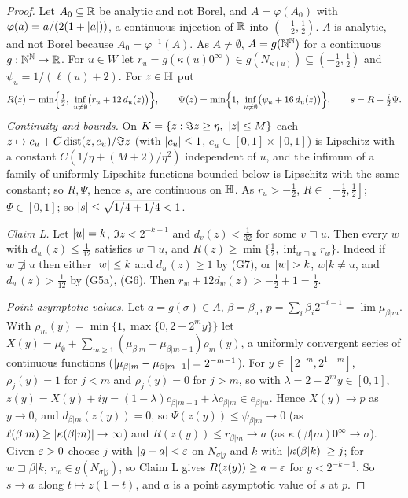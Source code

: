 \begin{proof}
Let $A_0\subseteq\mathbb{R}$ be analytic and not Borel, and $A=\varphi(A_0)$ with $\varphi(a)=a/(2(1+\lvert a\rvert))$, a continuous injection of $\mathbb{R}$
into $(-\frac12,\frac12)$. $A$ is analytic, and not Borel because $A_0=\varphi^{-1}(A)$. As $A\neq\emptyset$, $A=g(\mathbb{N}^{\mathbb{N}})$ for a continuous
$g:\mathbb{N}^{\mathbb{N}}\to\mathbb{R}$. For $u\in W$ let $r_u=g(\kappa(u)0^\infty)\in g(N_{\kappa(u)})\subseteq(-\frac12,\frac12)$ and $\psi_u=1/(\ell(u)+2)$. For $z\in\mathbb{H}$ put
\[R(z)=\min\Bigl\{\tfrac12,\ \inf_{u\ne\emptyset}\bigl(r_u+12\,d_u(z)\bigr)\Bigr\},\qquad
\Psi(z)=\min\Bigl\{1,\ \inf_{u\ne\emptyset}\bigl(\psi_u+16\,d_u(z)\bigr)\Bigr\},\qquad s=R+\tfrac i2\Psi.\]
\emph{Continuity and bounds.} On $K=\{z:\Im z\ge\eta,\ \lvert z\rvert\le M\}$ each $z\mapsto c_u+C\operatorname{dist}(z,e_u)/\Im z$ (with $\lvert c_u\rvert\le1$,
$e_u\subseteq[0,1]\times[0,1]$) is Lipschitz with a constant $C(1/\eta+(M+2)/\eta^2)$ independent of $u$, and the infimum of a family of
uniformly Lipschitz functions bounded below is Lipschitz with the same constant; so $R,\Psi$, hence $s$, are continuous on $\mathbb{H}$.
As $r_u>-\frac12$, $R\in[-\frac12,\frac12]$; $\Psi\in[0,1]$; so $\lvert s\rvert\le\sqrt{1/4+1/4}<1$.

\emph{Claim L.} Let $\lvert u\rvert=k$, $\Im z<2^{-k-1}$ and $d_v(z)<\frac1{32}$ for some $v\sqsupset u$. Then every $w$ with $d_w(z)\le\frac1{12}$
satisfies $w\sqsupset u$, and $R(z)\ge\min\{\frac12,\inf_{w\sqsupset u}r_w\}$. Indeed if $w\not\sqsupset u$ then either $\lvert w\rvert\le k$ and
$d_w(z)\ge1$ by (G7), or $\lvert w\rvert>k$, $w|k\ne u$, and $d_w(z)>\frac1{12}$ by (G5a), (G6). Then $r_w+12d_w(z)>-\frac12+1=\frac12$.

\emph{Point asymptotic values.} Let $a=g(\sigma)\in A$, $\beta=\beta_\sigma$, $p=\sum_i\beta_i2^{-i-1}=\lim\mu_{\beta|m}$. With
$\rho_m(y)=\min\{1,\max\{0,2-2^my\}\}$ let $X(y)=\mu_\emptyset+\sum_{m\ge1}(\mu_{\beta|m}-\mu_{\beta|m-1})\rho_m(y)$, a uniformly convergent
series of continuous functions ($\lvert \mu_{\beta|m}-\mu_{\beta|m-1}\rvert=2^{-m-1}$). For $y\in[2^{-m},2^{1-m}]$, $\rho_j(y)=1$ for $j<m$ and
$\rho_j(y)=0$ for $j>m$, so with $\lambda=2-2^my\in[0,1]$, $z(y)=X(y)+iy=(1-\lambda)c_{\beta|m-1}+\lambda c_{\beta|m}\in e_{\beta|m}$. Hence
$X(y)\to p$ as $y\to0$, and $d_{\beta|m}(z(y))=0$, so $\Psi(z(y))\le\psi_{\beta|m}\to0$ (as $\ell(\beta|m)\ge\lvert \kappa(\beta|m)\rvert\to\infty$)
and $R(z(y))\le r_{\beta|m}\to a$ (as $\kappa(\beta|m)0^\infty\to\sigma$). Given $\varepsilon>0$ choose $j$ with $\lvert g-a\rvert<\varepsilon$ on $N_{\sigma|j}$
and $k$ with $\lvert \kappa(\beta|k)\rvert\ge j$; for $w\sqsupset\beta|k$, $r_w\in g(N_{\sigma|j})$, so Claim L gives $R(z(y))\ge a-\varepsilon$ for
$y<2^{-k-1}$. So $s\to a$ along $t\mapsto z(1-t)$, and $a$ is a point asymptotic value of $s$ at $p$.


\end{proof}
